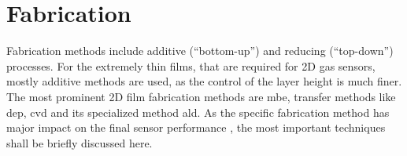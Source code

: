 \section{Fabrication}
\label{sec:fabrication}
Fabrication methods include additive (\enquote{bottom-up}) and reducing (\enquote{top-down}) processes. For the extremely thin films, that are required for 2D gas sensors, mostly additive methods are used, as the control of the layer height is much finer. The most prominent 2D film fabrication methods are \gls{mbe}, transfer methods like \gls{dep}, \gls{cvd} and its specialized method \gls{ald}. As the specific fabrication method has major impact on the final sensor performance \cite{Deng2019}, the most important techniques shall be briefly discussed here.
